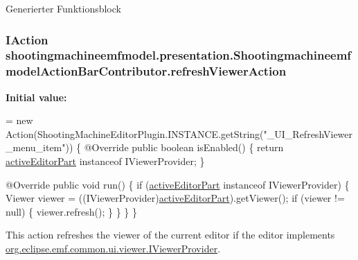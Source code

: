 Generierter Funktionsblock \hypertarget{classshootingmachineemfmodel_1_1presentation_1_1_shootingmachineemfmodel_action_bar_contributor_a81a2ce3c0bbe7aa402f5ef279d6d5bf0}{
\subsubsection[{refresh\-Viewer\-Action}]{\setlength{\rightskip}{0pt plus 5cm}I\-Action shootingmachineemfmodel.\-presentation.\-Shootingmachineemfmodel\-Action\-Bar\-Contributor.\-refresh\-Viewer\-Action\hspace{0.3cm}{\ttfamily [protected]}}}\label{classshootingmachineemfmodel_1_1presentation_1_1_shootingmachineemfmodel_action_bar_contributor_a81a2ce3c0bbe7aa402f5ef279d6d5bf0}
{\bfseries Initial value\-:}
\begin{DoxyCode}
=
        \textcolor{keyword}{new} Action(ShootingMachineEditorPlugin.INSTANCE.getString(\textcolor{stringliteral}{"\_UI\_RefreshViewer\_menu\_item"})) \{
            @Override
            \textcolor{keyword}{public} \textcolor{keywordtype}{boolean} isEnabled() \{
                \textcolor{keywordflow}{return} \hyperlink{classshootingmachineemfmodel_1_1presentation_1_1_shootingmachineemfmodel_action_bar_contributor_aa8d7df0f5b01cd15b5cf8b42bd84ea41}{activeEditorPart} instanceof IViewerProvider;
            \}

            @Override
            \textcolor{keyword}{public} \textcolor{keywordtype}{void} run() \{
                \textcolor{keywordflow}{if} (\hyperlink{classshootingmachineemfmodel_1_1presentation_1_1_shootingmachineemfmodel_action_bar_contributor_aa8d7df0f5b01cd15b5cf8b42bd84ea41}{activeEditorPart} instanceof IViewerProvider) \{
                    Viewer viewer = ((IViewerProvider)\hyperlink{classshootingmachineemfmodel_1_1presentation_1_1_shootingmachineemfmodel_action_bar_contributor_aa8d7df0f5b01cd15b5cf8b42bd84ea41}{activeEditorPart}).getViewer();
                    \textcolor{keywordflow}{if} (viewer != null) \{
                        viewer.refresh();
                    \}
                \}
            \}
        \}
\end{DoxyCode}
This action refreshes the viewer of the current editor if the editor implements \hyperlink{}{org.\-eclipse.\-emf.\-common.\-ui.\-viewer.\-I\-Viewer\-Provider}.

